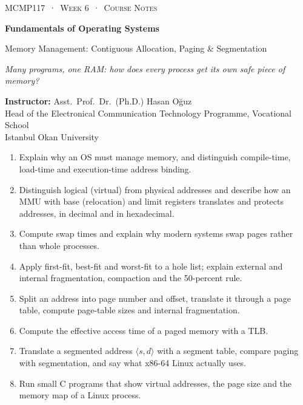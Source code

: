 \documentclass[11pt,a4paper]{article}
\begin{document}
\thispagestyle{empty}
\begin{tcolorbox}[enhanced,colback=dark,colframe=dark,arc=0pt,boxrule=0pt,
  left=18pt,right=18pt,top=20pt,bottom=20pt,coltext=white]
{\small\color{mint}\textsc{MCMP117 \,·\, Week 6 \,·\, Course Notes}}\par\medskip
{\headfont\fontsize{26}{30}\selectfont\bfseries Fundamentals of Operating Systems}\par\medskip
{\large Memory Management: Contiguous Allocation, Paging \& Segmentation}\par\smallskip
{\small\itshape\color{white!70} Many programs, one RAM: how does every process get its own safe piece of memory?}
\end{tcolorbox}

\vspace{0.4em}
{\small
\textbf{Instructor:} Asst.\ Prof.\ Dr.\ (Ph.D.) Hasan Oğuz\\
Head of the Electronical Communication Technology Programme, Vocational School\\
Istanbul Okan University\par}

\vspace{0.8em}
\begin{keyidea}
\begin{enumerate}[leftmargin=1.4em]
  \item Explain why an OS must manage memory, and distinguish compile-time, load-time and execution-time address binding.
  \item Distinguish logical (virtual) from physical addresses and describe how an MMU with base (relocation) and limit registers translates and protects addresses, in decimal and in hexadecimal.
  \item Compute swap times and explain why modern systems swap pages rather than whole processes.
  \item Apply first-fit, best-fit and worst-fit to a hole list; explain external and internal fragmentation, compaction and the 50-percent rule.
  \item Split an address into page number and offset, translate it through a page table, compute page-table sizes and internal fragmentation.
  \item Compute the effective access time of a paged memory with a TLB.
  \item Translate a segmented address $\langle s, d\rangle$ with a segment table, compare paging with segmentation, and say what x86-64 Linux actually uses.
  \item Run small C programs that show virtual addresses, the page size and the memory map of a Linux process.
\end{enumerate}
\end{keyidea}
\end{document}
